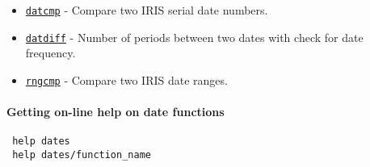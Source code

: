  \begin{itemize}
 \item
   \href{dates/datcmp}{\texttt{datcmp}} - Compare two IRIS serial date
   numbers.
 \item
   \href{dates/datdiff}{\texttt{datdiff}} - Number of periods between two
   dates with check for date frequency.
 \item
   \href{dates/rngcmp}{\texttt{rngcmp}} - Compare two IRIS date ranges.
 \end{itemize}
 
 \paragraph{Getting on-line help on date functions}
 
 \begin{verbatim}
 help dates
 help dates/function_name
 \end{verbatim}



